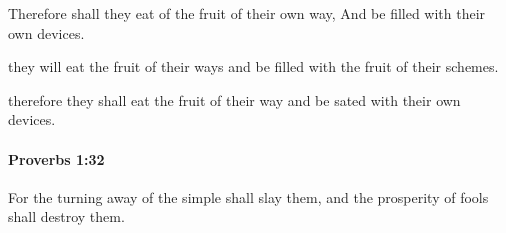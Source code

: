 			\begin{versebox}
					\item[BHS] 
					\item[ASV] Therefore shall they eat of the fruit of their own way, And be filled with their own devices.
					\item[NIV] they will eat the fruit of their ways and be filled with the fruit of their schemes.
					\item[NRSV] therefore they shall eat the fruit of their way and be sated with their own devices.
			\end{versebox}

		\paragraph{Proverbs 1:32} %
			\label{PROVERBS-1-32}

			For the turning away of the simple shall slay them, and the prosperity of fools shall destroy them.

